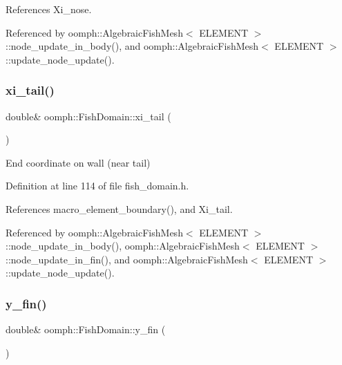 References Xi\+\_\+nose.



Referenced by oomph\+::\+Algebraic\+Fish\+Mesh$<$ E\+L\+E\+M\+E\+N\+T $>$\+::node\+\_\+update\+\_\+in\+\_\+body(), and oomph\+::\+Algebraic\+Fish\+Mesh$<$ E\+L\+E\+M\+E\+N\+T $>$\+::update\+\_\+node\+\_\+update().

\mbox{\label{classoomph_1_1FishDomain_ae2bcc0014506ba2225b928f319a27c9d}} 
\subsubsection{\texorpdfstring{xi\+\_\+tail()}{xi\_tail()}}
{\footnotesize\ttfamily double\& oomph\+::\+Fish\+Domain\+::xi\+\_\+tail (\begin{DoxyParamCaption}{ }\end{DoxyParamCaption})\hspace{0.3cm}{\ttfamily [inline]}}



End coordinate on wall (near tail) 



Definition at line 114 of file fish\+\_\+domain.\+h.



References macro\+\_\+element\+\_\+boundary(), and Xi\+\_\+tail.



Referenced by oomph\+::\+Algebraic\+Fish\+Mesh$<$ E\+L\+E\+M\+E\+N\+T $>$\+::node\+\_\+update\+\_\+in\+\_\+body(), oomph\+::\+Algebraic\+Fish\+Mesh$<$ E\+L\+E\+M\+E\+N\+T $>$\+::node\+\_\+update\+\_\+in\+\_\+fin(), and oomph\+::\+Algebraic\+Fish\+Mesh$<$ E\+L\+E\+M\+E\+N\+T $>$\+::update\+\_\+node\+\_\+update().

\mbox{\label{classoomph_1_1FishDomain_ae1a869cee7946b178a09214725e27f29}} 
\subsubsection{\texorpdfstring{y\+\_\+fin()}{y\_fin()}}
{\footnotesize\ttfamily double\& oomph\+::\+Fish\+Domain\+::y\+\_\+fin (\begin{DoxyParamCaption}{ }\end{DoxyParamCaption})\hspace{0.3cm}{\ttfamily [inline]}}



